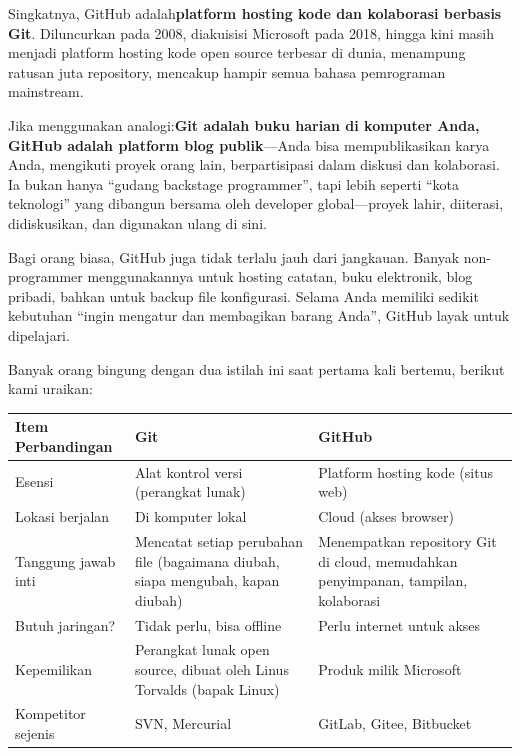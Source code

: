 


Singkatnya, GitHub adalah\textbf{platform hosting kode dan kolaborasi berbasis Git}. Diluncurkan pada 2008, diakuisisi Microsoft pada 2018, hingga kini masih menjadi platform hosting kode open source terbesar di dunia, menampung ratusan juta repository, mencakup hampir semua bahasa pemrograman mainstream.

Jika menggunakan analogi:\textbf{Git adalah buku harian di komputer Anda, GitHub adalah platform blog publik}—Anda bisa mempublikasikan karya Anda, mengikuti proyek orang lain, berpartisipasi dalam diskusi dan kolaborasi. Ia bukan hanya “gudang backstage programmer”, tapi lebih seperti “kota teknologi” yang dibangun bersama oleh developer global—proyek lahir, diiterasi, didiskusikan, dan digunakan ulang di sini.

Bagi orang biasa, GitHub juga tidak terlalu jauh dari jangkauan. Banyak non-programmer menggunakannya untuk hosting catatan, buku elektronik, blog pribadi, bahkan untuk backup file konfigurasi. Selama Anda memiliki sedikit kebutuhan “ingin mengatur dan membagikan barang Anda”, GitHub layak untuk dipelajari.


Banyak orang bingung dengan dua istilah ini saat pertama kali bertemu, berikut kami uraikan:

\begin{center}
\begin{tabularx}{\linewidth}{|X|X|X|}
\hline
\textbf{Item Perbandingan} & \textbf{Git} & \textbf{GitHub} \tabularnewline
\hline
Esensi & Alat kontrol versi (perangkat lunak) & Platform hosting kode (situs web) \tabularnewline
Lokasi berjalan & Di komputer lokal & Cloud (akses browser) \tabularnewline
Tanggung jawab inti & Mencatat setiap perubahan file (bagaimana diubah, siapa mengubah, kapan diubah) & Menempatkan repository Git di cloud, memudahkan penyimpanan, tampilan, kolaborasi \tabularnewline
Butuh jaringan? & Tidak perlu, bisa offline & Perlu internet untuk akses \tabularnewline
Kepemilikan & Perangkat lunak open source, dibuat oleh Linus Torvalds (bapak Linux) & Produk milik Microsoft \tabularnewline
Kompetitor sejenis & SVN, Mercurial & GitLab, Gitee, Bitbucket \tabularnewline
\hline
\end{tabularx}
\end{center}

